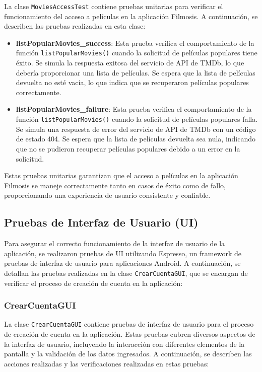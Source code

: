 \documentclass{article}
\begin{document}
La clase \texttt{MoviesAccessTest} contiene pruebas unitarias para verificar el funcionamiento del acceso a películas en la aplicación Filmosis. A continuación, se describen las pruebas realizadas en esta clase:

\begin{itemize}
    \item \textbf{listPopularMovies\_success}: Esta prueba verifica el comportamiento de la función \texttt{listPopularMovies()} cuando la solicitud de películas populares tiene éxito. Se simula la respuesta exitosa del servicio de API de TMDb, lo que debería proporcionar una lista de películas. Se espera que la lista de películas devuelta no esté vacía, lo que indica que se recuperaron películas populares correctamente.
    
    \item \textbf{listPopularMovies\_failure}: Esta prueba verifica el comportamiento de la función \texttt{listPopularMovies()} cuando la solicitud de películas populares falla. Se simula una respuesta de error del servicio de API de TMDb con un código de estado 404. Se espera que la lista de películas devuelta sea nula, indicando que no se pudieron recuperar películas populares debido a un error en la solicitud.
\end{itemize}

Estas pruebas unitarias garantizan que el acceso a películas en la aplicación Filmosis se maneje correctamente tanto en casos de éxito como de fallo, proporcionando una experiencia de usuario consistente y confiable.


\subsection{Pruebas de Interfaz de Usuario (UI)}

Para asegurar el correcto funcionamiento de la interfaz de usuario de la aplicación, se realizaron pruebas de UI utilizando Espresso, un framework de pruebas de interfaz de usuario para aplicaciones Android. A continuación, se detallan las pruebas realizadas en la clase \texttt{CrearCuentaGUI}, que se encargan de verificar el proceso de creación de cuenta en la aplicación:


\subsubsection{CrearCuentaGUI}

La clase \texttt{CrearCuentaGUI} contiene pruebas de interfaz de usuario para el proceso de creación de cuenta en la aplicación. Estas pruebas cubren diversos aspectos de la interfaz de usuario, incluyendo la interacción con diferentes elementos de la pantalla y la validación de los datos ingresados. A continuación, se describen las acciones realizadas y las verificaciones realizadas en estas pruebas:
\end{document}
